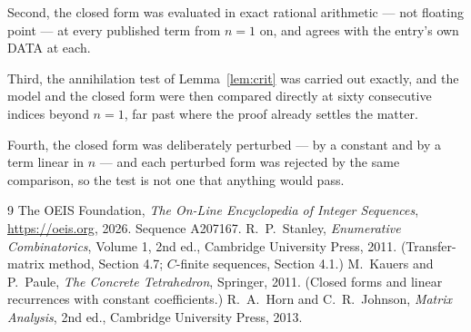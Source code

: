 \documentclass[11pt,a4paper]{article}
\theoremstyle{plain}
\theoremstyle{definition}
\begin{document}
Second, the closed form was evaluated in exact rational arithmetic --- not floating point ---
at every published term from $n=1$ on, and agrees with the entry's own DATA at each.

Third, the annihilation test of Lemma~\ref{lem:crit} was carried out exactly, and the model
and the closed form were then compared directly at sixty consecutive indices beyond
$n=1$, far past where the proof already settles the matter.

Fourth, the closed form was deliberately perturbed --- by a constant and by a term linear in
$n$ --- and each perturbed form was rejected by the same comparison, so the test is not one
that anything would pass.

\begin{thebibliography}{9}
 The OEIS Foundation, \emph{The On-Line Encyclopedia of Integer
Sequences}, \url{https://oeis.org}, 2026. Sequence A207167.
 R.~P.~Stanley, \emph{Enumerative Combinatorics}, Volume 1, 2nd ed.,
Cambridge University Press, 2011. (Transfer-matrix method, Section 4.7; $C$-finite sequences,
Section 4.1.)
 M.~Kauers and P.~Paule, \emph{The Concrete Tetrahedron}, Springer, 2011.
(Closed forms and linear recurrences with constant coefficients.)
 R.~A.~Horn and C.~R.~Johnson, \emph{Matrix Analysis}, 2nd ed., Cambridge
University Press, 2013.
\end{thebibliography}
\end{document}
